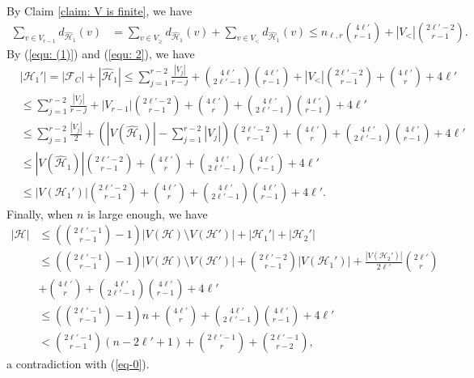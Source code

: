 \documentclass[12pt]{article}%
\newcommand{\mh}{\mathcal{H}}
\begin{document}
\par
By Claim \ref{claim: V is finite}, we have%
\begin{equation}\label{equ: 2}
    \begin{aligned}
        \sum_{v\in V_{r-1}}d_{\hat{\mh}_{1}}(v)&=\sum_{v\in V_{\geq}}d_{\hat{\mh}_{1}}(v)+\sum_{v\in V_{<}}d_{\hat{\mh}_{1}}(v)
        \leq n_{\ell,r}\binom{4\ell'}{r-1}+|V_{<}|\binom{2\ell'-2}{r-1}.
    \end{aligned}
\end{equation}
By (\ref{equ: (1)}) and (\ref{equ: 2}), we have
\begin{equation*}
\begin{aligned}
    &|\mh_{1}'|=|\mathcal{F}_{C}|+|\hat{\mh}_{1}|
    \leq \sum_{j=1}^{r-2}\frac{|V_{j}|}{r-j}+\binom{4\ell'}{2\ell'-1}\binom{4\ell'}{r-1}+|V_{<}|\binom{2\ell'-2}{r-1}+\binom{4\ell'}{r}+4\ell'\\
    &\leq \sum_{j=1}^{r-2}\frac{|V_{j}|}{r-j}+|V_{r-1}|\binom{2\ell'-2}{r-1}+\binom{4\ell'}{r}+\binom{4\ell'}{2\ell'-1}\binom{4\ell'}{r-1}+4\ell'\\
    &\leq \sum_{j=1}^{r-2}\frac{|V_{j}|}{2}+\left(|V(\hat{\mh}_{1})|-\sum_{j=1}^{r-2}|V_{j}|\right)\binom{2\ell'-2}{r-1}+\binom{4\ell'}{r}+\binom{4\ell'}{2\ell'-1}\binom{4\ell'}{r-1}+4\ell'\\
    &\leq |V(\hat{\mh}_{1})|\binom{2\ell'-2}{r-1}+\binom{4\ell'}{r}+\binom{4\ell'}{2\ell'-1}\binom{4\ell'}{r-1}+4\ell'\\
    &\leq|V(\mh_{1}')|\binom{2\ell'-2}{r-1}+\binom{4\ell'}{r}+\binom{4\ell'}{2\ell'-1}\binom{4\ell'}{r-1}+4\ell'.
\end{aligned}
\end{equation*}
Finally, when $n$ is large enough, we have
\begin{equation*}
    \begin{aligned}
        |\mh|&\leq\left(\binom{2\ell'-1}{r-1}-1\right)|V(\mh)\setminus V(\mh')|+|\mh_{1}'|+|\mh_{2}'|\\
        &\leq \left(\binom{2\ell'-1}{r-1}-1\right)|V(\mh)\setminus V(\mh')|+\binom{2\ell'-2}{r-1}|V(\mh_{1}')|+\frac{|V(\mh_{2}')|}{2\ell'}\binom{2\ell'}{r} \\
        &+\binom{4\ell'}{r}+\binom{4\ell'}{2\ell'-1}\binom{4\ell'}{r-1}+4\ell'\\
        &\leq \left(\binom{2\ell'-1}{r-1}-1\right)n+\binom{4\ell'}{r}+\binom{4\ell'}{2\ell'-1}\binom{4\ell'}{r-1}+4\ell'\\
        &< \binom{2\ell'-1}{r-1}(n-2\ell'+1)+\binom{2\ell'-1}{r}+\binom{2\ell'-1}{r-2},
    \end{aligned}
\end{equation*}
a contradiction with  (\ref{eq-0}).
\end{document}
